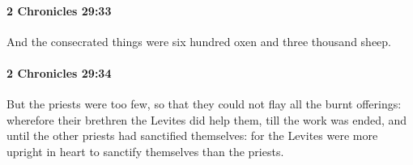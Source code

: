 		\paragraph{2 Chronicles 29:33} %
			\label{2CHRONICLES-29-33}

			And the consecrated things were six hundred oxen and three thousand sheep.


		\paragraph{2 Chronicles 29:34} %
			\label{2CHRONICLES-29-34}

			But the priests were too few, so that they could not flay all the burnt offerings: wherefore their brethren the Levites did help them, till the work was ended, and until the other priests had sanctified themselves: for the Levites were more upright in heart to sanctify themselves than the priests.

